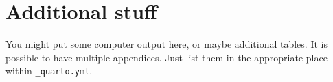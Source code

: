 \documentclass[
  letterpaper,
  DIV=11,
  numbers=noendperiod]{scrreprt}
\begin{document}
\cleardoublepage
{}
{}
\appendix

\hypertarget{additional-stuff}{%
\chapter{Additional stuff}\label{additional-stuff}}

You might put some computer output here, or maybe additional tables. It
is possible to have multiple appendices. Just list them in the
appropriate place within \texttt{\_quarto.yml}.
\end{document}
